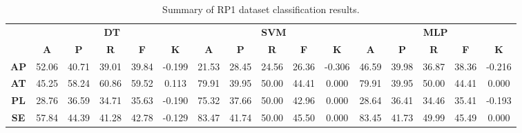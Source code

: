 \begin{landscape}
\begin{table}[htbp]
\footnotesize
\centering
\caption{Summary of RP1 dataset classification results.}
\label{tab:base_female}
\begin{tabular}{|c|c|c|c|c|c|c|c|c|c|c|c|c|c|c|c|}
\hline
\multirow{2}{*}{}	& \multicolumn{5}{c|}{\textbf{DT}}												& \multicolumn{5}{c|}{\textbf{SVM}}												& \multicolumn{5}{c|}{\textbf{MLP}}												\\ \cline{2-16} 
					& \textbf{A}	& \textbf{P}	& \textbf{R}	& \textbf{F}	& \textbf{K}	& \textbf{A}	& \textbf{P}	& \textbf{R}	& \textbf{F}	& \textbf{K}	& \textbf{A}	& \textbf{P}	& \textbf{R}	& \textbf{F}	& \textbf{K}	\\ \hline
\textbf{AP}			& 52.06			& 40.71			& 39.01			& 39.84			& -0.199			& 21.53			& 28.45			& 24.56			& 26.36			& -0.306			& 46.59			& 39.98			& 36.87			& 38.36			& -0.216			\\ \hline
\textbf{AT}			& 45.25			& 58.24			& 60.86			& 59.52			& 0.113			& 79.91			& 39.95			& 50.00			& 44.41			& 0.000			& 79.91			& 39.95			& 50.00			& 44.41			& 0.000			\\ \hline
\textbf{PL}			& 28.76			& 36.59			& 34.71			& 35.63			& -0.190			& 75.32			& 37.66			& 50.00			& 42.96			& 0.000			& 28.64			& 36.41			& 34.46			& 35.41			& -0.193			\\ \hline
\textbf{SE}			& 57.84			& 44.39			& 41.28			& 42.78			& -0.129			& 83.47			& 41.74			& 50.00			& 45.50			& 0.000			& 83.45			& 41.73			& 49.99			& 45.49			& 0.000			\\ \hline
\end{tabular}
\end{table}
\end{landscape}